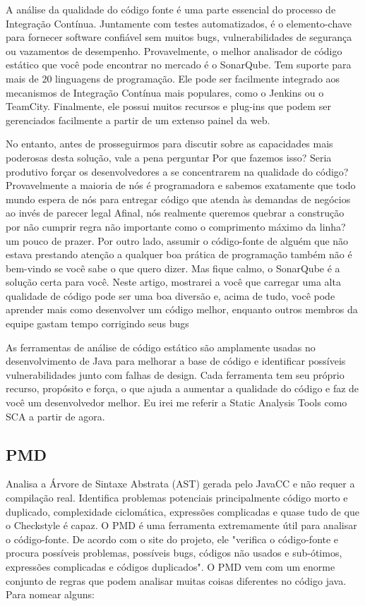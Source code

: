 \documentclass[12pt]{article}
\begin{document}
%
%

A análise da qualidade do código fonte é uma parte essencial do processo de Integração Contínua. Juntamente com testes automatizados, é o elemento-chave para fornecer software confiável sem muitos bugs, vulnerabilidades de segurança ou vazamentos de desempenho. Provavelmente, o melhor analisador de código estático que você pode encontrar no mercado é o SonarQube. Tem suporte para mais de 20 linguagens de programação. Ele pode ser facilmente integrado aos mecanismos de Integração Contínua mais populares, como o Jenkins ou o TeamCity. Finalmente, ele possui muitos recursos e plug-ins que podem ser gerenciados facilmente a partir de um extenso painel da web.

No entanto, antes de prosseguirmos para discutir sobre as capacidades mais poderosas desta solução, vale a pena perguntar Por que fazemos isso? Seria produtivo forçar os desenvolvedores a se concentrarem na qualidade do código? Provavelmente a maioria de nós é programadora e sabemos exatamente que todo mundo espera de nós para entregar código que atenda às demandas de negócios ao invés de parecer legal Afinal, nós realmente queremos quebrar a construção por não cumprir regra não importante como o comprimento máximo da linha? um pouco de prazer. Por outro lado, assumir o código-fonte de alguém que não estava prestando atenção a qualquer boa prática de programação também não é bem-vindo se você sabe o que quero dizer. Mas fique calmo, o SonarQube é a solução certa para você. Neste artigo, mostrarei a você que carregar uma alta qualidade de código pode ser uma boa diversão e, acima de tudo, você pode aprender mais como desenvolver um código melhor, enquanto outros membros da equipe gastam tempo corrigindo seus bugs

%
%

As ferramentas de análise de código estático são amplamente usadas no desenvolvimento de Java para melhorar a base de código e identificar possíveis vulnerabilidades junto com falhas de design. Cada ferramenta tem seu próprio recurso, propósito e força, o que ajuda a aumentar a qualidade do código e faz de você um desenvolvedor melhor. Eu irei me referir a Static Analysis Tools como SCA a partir de agora.

\subsection{PMD} \label{sec:pmd}
Analisa a Árvore de Sintaxe Abstrata (AST) gerada pelo JavaCC e não requer a compilação real.
     Identifica problemas potenciais principalmente código morto e duplicado, complexidade ciclomática, expressões complicadas e quase tudo de que o Checkstyle é capaz.
		O PMD é uma ferramenta extremamente útil para analisar o código-fonte. De acordo com o site do projeto, ele "verifica o código-fonte e procura possíveis problemas, possíveis bugs, códigos não usados e sub-ótimos, expressões complicadas e códigos duplicados". O PMD vem com um enorme conjunto de regras que podem analisar muitas coisas diferentes no código java. Para nomear alguns:
\end{document}
